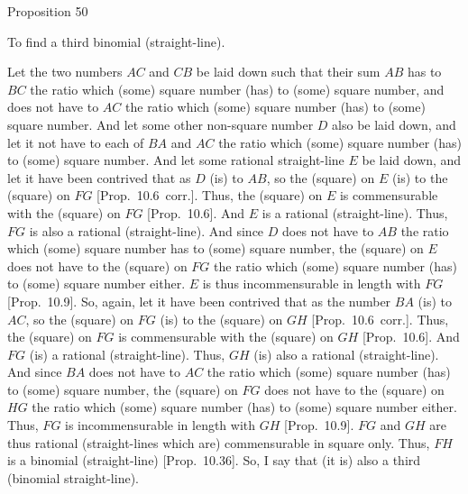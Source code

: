 
\begin{center}
{\large Proposition 50}
\end{center}

To find a third binomial (straight-line).

\epsfysize=1.1in
\centerline{}

Let the two numbers $AC$ and $CB$ be laid down such that their sum
$AB$ has to $BC$ the ratio which (some) square number (has) to
(some) square number, and does not have to $AC$ the ratio which (some)
square number (has) to (some) square number. And let some other non-square number
$D$ also be laid down, and let it not have to each of $BA$ and $AC$ the
ratio which (some) square number (has) to (some) square number.
And let some rational straight-line $E$ be laid down, and let it have been
contrived that as $D$ (is) to $AB$, so the (square) on $E$ (is) to
the (square) on $FG$ [Prop.~10.6~corr.]. Thus,
the (square) on $E$ is commensurable with the (square) on $FG$ [Prop.~10.6]. And $E$ is a rational (straight-line).
Thus, $FG$ is also a rational (straight-line). And since $D$ does not have to
$AB$ the ratio which (some) square number has to (some) square number,
the (square) on $E$ does not have to the (square) on $FG$ the ratio
which (some) square number (has) to (some) square number either.
$E$ is thus incommensurable in length with $FG$ [Prop.~10.9]. So, again, let it have been contrived that
as the number $BA$ (is) to $AC$, so the (square) on  $FG$ (is) to the
(square) on $GH$ [Prop.~10.6~corr.]. Thus,
the (square) on $FG$ is commensurable with the (square) on $GH$
[Prop.~10.6]. And $FG$ (is) a rational (straight-line).
Thus, $GH$ (is) also a rational (straight-line). And since $BA$ does not have to $AC$ the ratio which (some) square number (has) to (some) square number, the (square) on $FG$  does not have to the (square) on $HG$
the ratio which (some) square number (has) to (some) square number either.
Thus, $FG$ is incommensurable in length with $GH$ [Prop.~10.9].  $FG$ and $GH$ are thus rational
(straight-lines which are) commensurable in square only. Thus,
$FH$ is a binomial (straight-line) [Prop.~10.36].
So, I say that (it is) also a third (binomial straight-line).

